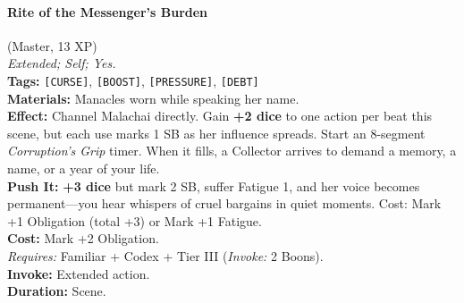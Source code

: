 \paragraph{Rite of the Messenger's Burden} (Master, 13 XP) \hfill \\
\emph{Extended; Self; Yes.} \\
\textbf{Tags:} \texttt{[CURSE]}, \texttt{[BOOST]}, \texttt{[PRESSURE]}, \texttt{[DEBT]} \\
\textbf{Materials:} Manacles worn while speaking her name. \\
\textbf{Effect:} Channel Malachai directly. Gain \textbf{+2 dice} to one action per beat this scene, but each use marks 1 SB as her influence spreads. Start an 8-segment \textit{Corruption's Grip} timer. When it fills, a Collector arrives to demand a memory, a name, or a year of your life. \\
\textbf{Push It:} \textbf{+3 dice} but mark 2 SB, suffer Fatigue 1, and her voice becomes permanent---you hear whispers of cruel bargains in quiet moments. Cost: Mark +1 Obligation (total +3) or Mark +1 Fatigue. \\
\textbf{Cost:} Mark +2 Obligation. \\
\textit{Requires:} Familiar + Codex + Tier III (\textit{Invoke:} 2 Boons). \\
\textbf{Invoke:} Extended action. \\
\textbf{Duration:} Scene.


